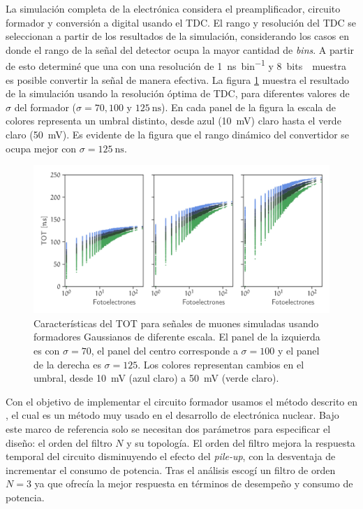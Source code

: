 La simulación completa de la electrónica considera el preamplificador, circuito formador y conversión a digital usando el TDC. El rango y resolución del TDC se seleccionan a partir de los resultados de la simulación, considerando los casos en donde el rango de la señal del detector ocupa la mayor cantidad de \emph{bins}. A partir de esto determiné que una con una resolución de \SI{1}{\ns\per bin} y \SI{8}{bits \per muestra} es posible convertir la señal de manera efectiva. La figura \ref{fig:tot-sigma} muestra el resultado de la simulación usando la resolución óptima de TDC, para diferentes valores de $\sigma$ del formador ($\sigma=70,100$ y $\SI{125}{\ns}$). En cada panel de la figura la escala de colores representa un umbral distinto, desde azul (\SI{10}{\milli\volt}) claro hasta el verde claro (\SI{50}{\milli\volt}). Es evidente de la figura que el rango dinámico del convertidor se ocupa mejor con $\sigma=\SI{125}{\ns}$.

\begin{figure}
        \centering
        \includegraphics[width=\textwidth]{tot_d30par.pdf}
        \caption{Características del TOT para señales de muones simuladas usando formadores Gaussianos de diferente escala. El panel de la izquierda es con $\sigma=70$, el panel del centro corresponde a $\sigma=100$ y el panel de la derecha es $\sigma=125$. Los colores representan cambios en el umbral, desde \SI{10}{\milli\volt} (azul claro) a \SI{50}{\milli\volt} (verde claro).}
        \label{fig:tot-sigma}
\end{figure}

Con el objetivo de implementar el circuito formador usamos el método descrito en \cite{ohkawa76}, el cual es un método muy usado en el desarrollo de electrónica nuclear. Bajo este marco de referencia solo se necesitan dos parámetros para especificar el diseño: el orden del filtro $N$ y su topología. El orden del filtro mejora la respuesta temporal del circuito disminuyendo el efecto del \emph{pile-up}, con la desventaja de incrementar el consumo de potencia. Tras el análisis escogí un filtro de orden $N=3$ ya que ofrecía la mejor respuesta en términos de desempeño y consumo de potencia.

